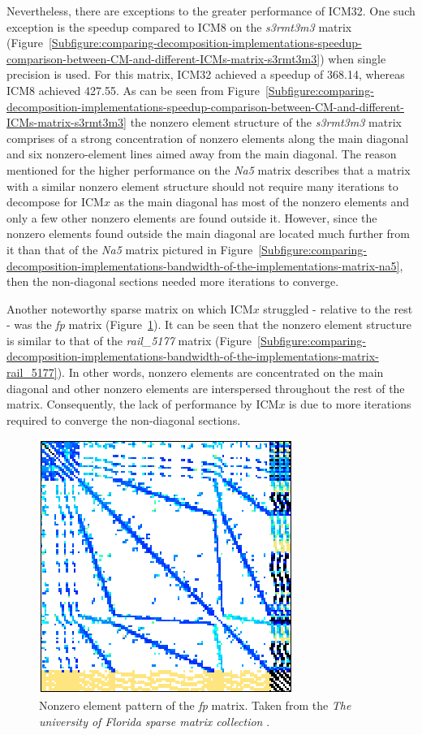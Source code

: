 Nevertheless, there are exceptions to the greater performance of ICM32. One such exception is the speedup compared to ICM8 on the \textit{s3rmt3m3} matrix (Figure~\ref{Subfigure:comparing-decomposition-implementations-speedup-comparison-between-CM-and-different-ICMs-matrix-s3rmt3m3}) when single precision is used. For this matrix, ICM32 achieved a speedup of 368.14, whereas ICM8 achieved 427.55. As can be seen from Figure~\ref{Subfigure:comparing-decomposition-implementations-speedup-comparison-between-CM-and-different-ICMs-matrix-s3rmt3m3} the nonzero element structure of the \textit{s3rmt3m3} matrix comprises of a strong concentration of nonzero elements along the main diagonal and six nonzero-element lines aimed away from the main diagonal. The reason mentioned for the higher performance on the \textit{Na5} matrix describes that a matrix with a similar nonzero element structure should not require many iterations to decompose for ICM$ x $ as the main diagonal has most of the nonzero elements and only a few other nonzero elements are found outside it. However, since the nonzero elements found outside the main diagonal are located much further from it than that of the \textit{Na5} matrix pictured in Figure~\ref{Subfigure:comparing-decomposition-implementations-bandwidth-of-the-implementations-matrix-na5}, then the non-diagonal sections needed more iterations to converge.
\par Another noteworthy sparse matrix on which ICM$ x $ struggled - relative to the rest - was the \textit{fp} matrix (Figure~\ref{Figure:comparing-decomposition-implementations-speedup-comparison-between-CM-and-different-ICMs-matrix-fp}). It can be seen that the nonzero element structure is similar to that of the \textit{rail\_5177} matrix (Figure~\ref{Subfigure:comparing-decomposition-implementations-bandwidth-of-the-implementations-matrix-rail_5177}). In other words, nonzero elements are concentrated on the main diagonal and other nonzero elements are interspersed throughout the rest of the matrix. Consequently, the lack of performance by ICM$ x $ is due to more iterations required to converge the non-diagonal sections.

\begin{figure}[ht!]
	\centering
	\includegraphics[width=.35\textwidth, keepaspectratio, clip]{images/ch3/matrices/fp.png}
	\caption{Nonzero element pattern of the \mbox{\textit{fp}} matrix. Taken from the \emph{The university of Florida sparse matrix collection} \cite{Davis2011}.}
	\label{Figure:comparing-decomposition-implementations-speedup-comparison-between-CM-and-different-ICMs-matrix-fp}
\end{figure}

